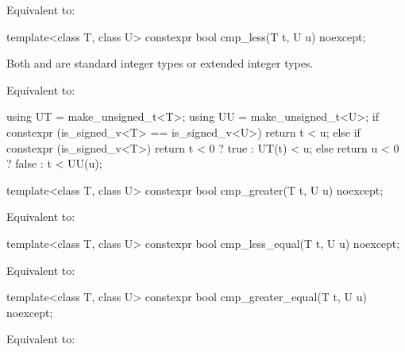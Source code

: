 \begin{itemdescr}
\pnum
\effects
Equivalent to: 
\end{itemdescr}

%
\begin{itemdecl}
template<class T, class U>
  constexpr bool cmp_less(T t, U u) noexcept;
\end{itemdecl}

\begin{itemdescr}
\pnum
\mandates
Both  and  are standard integer types or
extended integer types.

\pnum
\effects
Equivalent to:
\begin{codeblock}
using UT = make_unsigned_t<T>;
using UU = make_unsigned_t<U>;
if constexpr (is_signed_v<T> == is_signed_v<U>)
  return t < u;
else if constexpr (is_signed_v<T>)
  return t < 0 ? true : UT(t) < u;
else
  return u < 0 ? false : t < UU(u);
\end{codeblock}
\end{itemdescr}

%
\begin{itemdecl}
template<class T, class U>
  constexpr bool cmp_greater(T t, U u) noexcept;
\end{itemdecl}

\begin{itemdescr}
\pnum
\effects
Equivalent to: 
\end{itemdescr}

%
\begin{itemdecl}
template<class T, class U>
  constexpr bool cmp_less_equal(T t, U u) noexcept;
\end{itemdecl}

\begin{itemdescr}
\pnum
\effects
Equivalent to: 
\end{itemdescr}

%
\begin{itemdecl}
template<class T, class U>
  constexpr bool cmp_greater_equal(T t, U u) noexcept;
\end{itemdecl}

\begin{itemdescr}
\pnum
\effects
Equivalent to: 
\end{itemdescr}

